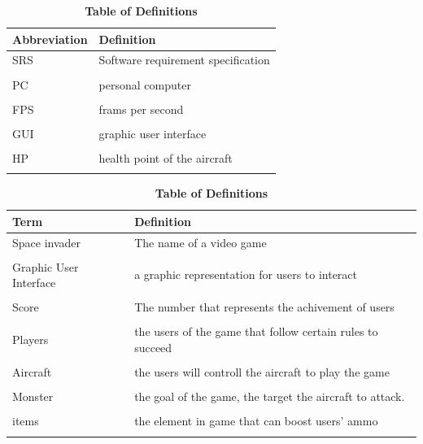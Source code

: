 \documentclass[12pt]{article}
\begin{document}
\begin{table}[hbp]
\caption{\textbf{Table of Abbreviations}}

\begin{tabularx}{\textwidth}{p{3cm}X}
\toprule
\textbf{Abbreviation} & \textbf{Definition} \\
\midrule
SRS & Software requirement specification\\\\
PC & personal computer\\\\
FPS & frams per second\\\\
GUI & graphic user interface\\\\
HP & health point of the aircraft\\\\

\bottomrule
\end{tabularx}



\caption{\textbf{Table of Definitions}}

\begin{tabularx}{\textwidth}{p{3cm}X}
\toprule
\textbf{Term} & \textbf{Definition}\\
\midrule
Space invader & The name of a video game\\\\
Graphic User Interface & a graphic representation for users to interact\\\\
Score & The number that represents the achivement of users\\\\
Players & the users of the game that follow certain rules to succeed\\\\
Aircraft & the users will controll the aircraft to play the game\\\\
Monster & the goal of the game, the target the aircraft to attack.\\\\
items & the element in game that can boost users' ammo\\\\
\bottomrule
\end{tabularx}

\end{table}	
\end{document}
